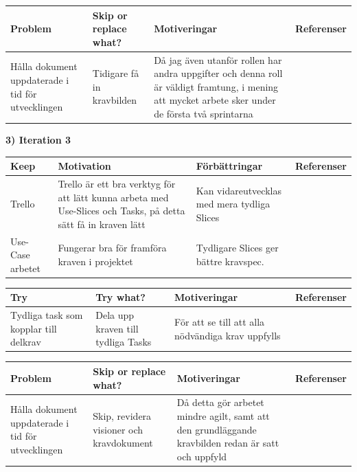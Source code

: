 \documentclass[conference,a4paper]{IEEEtran}
\newcommand\Tstrut{\rule{0pt}{2.6ex}}       %
\newcommand\Bstrut{\rule[-0.9ex]{0pt}{0pt}} %
\newcommand{\TBstrut}{\Tstrut\Bstrut} %
\begin{document}
\begin{table}[H]
	\small
  \centering
	\begin{tabular}{|p{1.5cm}|p{2cm}|p{1.8cm}|p{1.5cm}|} %
    \hline
    Problem & Skip or replace what? & Motiveringar & Referenser \TBstrut \\
    \hline
    Hålla dokument uppdaterade i tid för utvecklingen & Tidigare få in kravbilden & Då jag även utanför rollen har andra uppgifter och denna roll är väldigt framtung, i mening att mycket arbete sker under de första två sprintarna  &  \TBstrut \\
    \hline

  \end{tabular}
\end{table}

\textbf{3) Iteration 3}

\begin{table}[H]
	\small
  \centering
	\begin{tabular}{|p{1.5cm}|p{2cm}|p{1.8cm}|p{1.5cm}|} %
    \hline
    Keep & Motivation & Förbättringar & Referenser \TBstrut \\
    \hline
     Trello & Trello är ett bra verktyg för att lätt kunna arbeta med Use-Slices och Tasks, på detta sätt få in kraven lätt & Kan vidareutvecklas med mera tydliga Slices & \cite{Jacobson11} \TBstrut \\
    \hline
    Use-Case arbetet & Fungerar bra för framföra kraven i projektet & Tydligare Slices ger bättre kravspec. &\cite{Jacobson11} \TBstrut \\
    \hline
  \end{tabular}
\end{table}

\begin{table}[H]
	\small
  \centering
	\begin{tabular}{|p{1.5cm}|p{2cm}|p{1.8cm}|p{1.5cm}|} %
    \hline
    Try & Try what? & Motiveringar & Referenser \TBstrut \\
    \hline
     Tydliga task som kopplar till delkrav & Dela upp kraven till tydliga Tasks & För att se till att alla nödvändiga krav uppfylls & \TBstrut \\
    \hline
  \end{tabular}
\end{table}

\begin{table}[H]
	\small
  \centering
	\begin{tabular}{|p{1.5cm}|p{2cm}|p{1.8cm}|p{1.5cm}|} %
    \hline
    Problem & Skip or replace what? & Motiveringar & Referenser \TBstrut \\
    \hline
    Hålla dokument uppdaterade i tid för utvecklingen & Skip, revidera visioner och kravdokument & Då detta gör arbetet mindre agilt, samt att den grundläggande kravbilden redan är satt och uppfyld  &  \TBstrut \\
    \hline

  \end{tabular}
\end{table}
\end{document}
